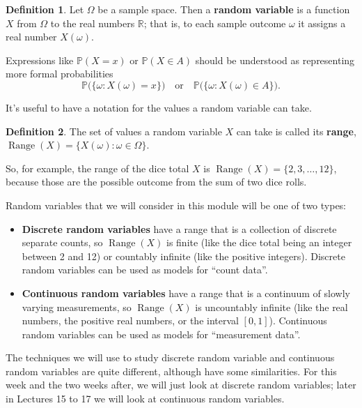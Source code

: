 \documentclass[
  a4paper,
]{book}
\theoremstyle{definition}
\newtheorem{definition}{Definition}[chapter]
\theoremstyle{definition}
\theoremstyle{definition}
\theoremstyle{definition}
\theoremstyle{remark}
\begin{document}
\begin{definition}
Let \(\Omega\) be a sample space. Then a \textbf{random variable} is a function \(X\) from \(\Omega\) to the real numbers \(\mathbb R\); that is, to each sample outcome \(\omega\) it assigns a real number \(X(\omega)\).

Expressions like \(\mathbb P(X = x)\) or \(\mathbb P(X \in A)\) should be understood as representing more formal probabilities
\[ \mathbb P \big( \{\omega : X(\omega) = x \}\big) \quad \text{or} \quad \mathbb P \big( \{\omega : X(\omega) \in A \}\big)  . \]
\end{definition}

It's useful to have a notation for the values a random variable can take.

\begin{definition}
The set of values a random variable \(X\) can take is called its \textbf{range}, \(\operatorname{Range}(X) = \{X(\omega) : \omega \in \Omega \}\).
\end{definition}

So, for example, the range of the dice total \(X\) is \(\operatorname{Range}(X) = \{2, 3, \dots, 12\}\), because those are the possible outcome from the sum of two dice rolls.

Random variables that we will consider in this module will be one of two types:

\begin{itemize}
\item
  \textbf{Discrete random variables} have a range that is a collection of discrete separate counts, so \(\operatorname{Range}(X)\) is finite (like the dice total being an integer between 2 and 12) or countably infinite (like the positive integers). Discrete random variables can be used as models for ``count data''.
\item
  \textbf{Continuous random variables} have a range that is a continuum of slowly varying measurements, so \(\operatorname{Range}(X)\) is uncountably infinite (like the real numbers, the positive real numbers, or the interval \([0,1]\)). Continuous random variables can be used as models for ``measurement data''.
\end{itemize}

The techniques we will use to study discrete random variable and continuous random variables are quite different, although have some similarities. For this week and the two weeks after, we will just look at discrete random variables; later in Lectures 15 to 17 we will look at continuous random variables.
\end{document}
